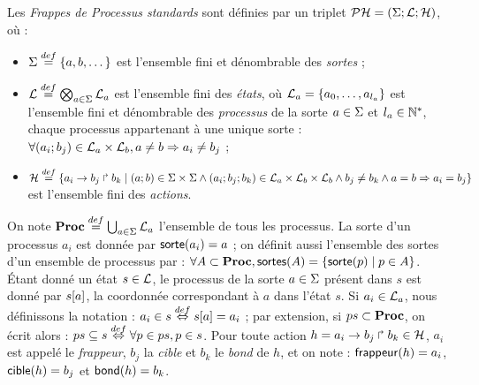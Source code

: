 \begin{definition}
  Les \emph{Frappes de Processus standards} sont définies
  par un triplet $\mathcal{PH} = (\Sigma; \mathcal{L}; \mathcal{H})$, où :
  \begin{itemize}
    \item $\Sigma \stackrel{def}= \{a, b, \dots\}$ est l'ensemble fini et dénombrable des \emph{sortes} ;
    \item $\mathcal{L} \stackrel{def}= \bigotimes_{a \in \Sigma} \mathcal{L}_a$ est l'ensemble fini des \emph{états},
      où $\mathcal{L}_a = \{a_0, \ldots, a_{l_a}\}$ est l'ensemble fini et dénombrable
      des \emph{processus} de la sorte $a \in \Sigma$ et $l_a \in \mathbb{N}^*$,
      chaque processus appartenant à une unique sorte :
      $\forall (a_i; b_j) \in \mathcal{L}_a \times \mathcal{L}_b, a \neq b \Rightarrow a_i \neq b_j$ ;
    \item $\mathcal{H} \stackrel{def}= \{a_i\rightarrow b_j\Rsh b_k \mid (a; b) \in \Sigma \times \Sigma \wedge
      (a_i; b_j; b_k) \in \mathcal{L}_a \times \mathcal{L}_b \times \mathcal{L}_b \wedge
      b_j \neq b_k \wedge a = b \Rightarrow a_i = b_j \}$ est l'ensemble fini des \emph{actions}.
  \end{itemize}
\end{definition}
%
\noindent
On note $\mathbf{Proc} \stackrel{def}= \bigcup_{a \in \Sigma} \mathcal{L}_a$ l'ensemble de tous les processus.
La sorte d'un processus $a_i$ est donnée par $\mathsf{sorte}(a_i) = a$ ;
on définit aussi l'ensemble des sortes d'un ensemble de processus par :
$\forall A \subset \mathbf{Proc}, \mathsf{sortes}(A) = \{ \mathsf{sorte}(p) \mid p \in A \}$.
Étant donné un état $s \in \mathcal{L}$, le processus de la sorte $a \in \Sigma$ présent dans $s$ est donné
par ${s[a]}$, \cad la coordonnée correspondant à $a$ dans l'état $s$.
Si $a_i \in \mathcal{L}_a$, nous définissons la notation : $a_i \in s \stackrel{def}\Leftrightarrow {s[a]} = a_i$ ;
par extension, si $ps \subset \mathbf{Proc}$, on écrit alors :
$ps \subseteq s \stackrel{def}\Leftrightarrow \forall p \in ps, p \in s$.
Pour toute action $h = a_i\rightarrow b_j\Rsh b_k \in \mathcal{H}$,
$a_i$ est appelé le \emph{frappeur}, $b_j$ la \emph{cible} et $b_k$ le \emph{bond} de $h$,
et on note : $\mathsf{frappeur}(h) = a_i$, $\mathsf{cible}(h) = b_j$ et $\mathsf{bond}(h) = b_k$.

